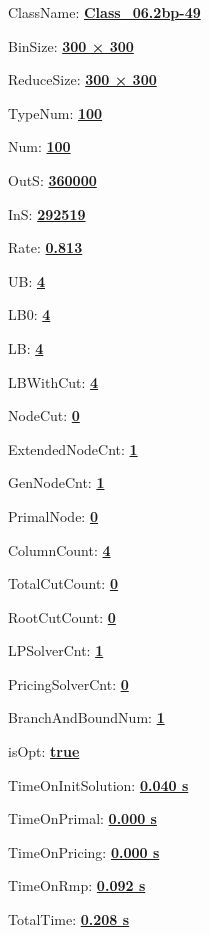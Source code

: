 \documentclass[11pt]{article}
\begin{document}
\pagestyle{empty}


ClassName: \underline{\textbf{Class_06.2bp-49}}
\par
BinSize: \underline{\textbf{300 × 300}}
\par
ReduceSize: \underline{\textbf{300 × 300}}
\par
TypeNum: \underline{\textbf{100}}
\par
Num: \underline{\textbf{100}}
\par
OutS: \underline{\textbf{360000}}
\par
InS: \underline{\textbf{292519}}
\par
Rate: \underline{\textbf{0.813}}
\par
UB: \underline{\textbf{4}}
\par
LB0: \underline{\textbf{4}}
\par
LB: \underline{\textbf{4}}
\par
LBWithCut: \underline{\textbf{4}}
\par
NodeCut: \underline{\textbf{0}}
\par
ExtendedNodeCnt: \underline{\textbf{1}}
\par
GenNodeCnt: \underline{\textbf{1}}
\par
PrimalNode: \underline{\textbf{0}}
\par
ColumnCount: \underline{\textbf{4}}
\par
TotalCutCount: \underline{\textbf{0}}
\par
RootCutCount: \underline{\textbf{0}}
\par
LPSolverCnt: \underline{\textbf{1}}
\par
PricingSolverCnt: \underline{\textbf{0}}
\par
BranchAndBoundNum: \underline{\textbf{1}}
\par
isOpt: \underline{\textbf{true}}
\par
TimeOnInitSolution: \underline{\textbf{0.040 s}}
\par
TimeOnPrimal: \underline{\textbf{0.000 s}}
\par
TimeOnPricing: \underline{\textbf{0.000 s}}
\par
TimeOnRmp: \underline{\textbf{0.092 s}}
\par
TotalTime: \underline{\textbf{0.208 s}}
\par
\newpage
\end{document}
